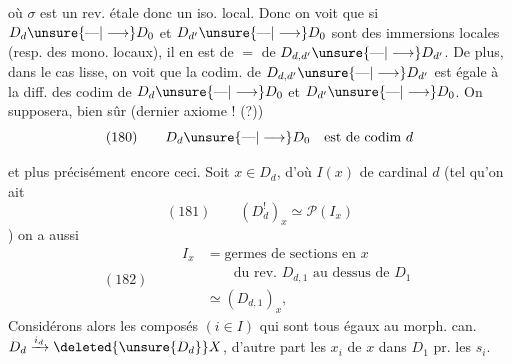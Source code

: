 où $\sigma$ est un rev. étale donc un iso. local. Donc on voit que si $D_d\unsure{\text{---}|\longrightarrow}D_0$ et $D_{d'}\unsure{\text{---}|\longrightarrow}D_0$ sont des immersions locales (resp. des mono. locaux), il en est de $=$ de $D_{d,d'}\unsure{\text{---}|\longrightarrow}D_{d'}$. De plus, dans le cas lisse, on voit que la codim. de $D_{d,d'}\unsure{\text{---}|\longrightarrow}D_{d'}$ est égale à la diff. des codim de $D_d\unsure{\text{---}|\longrightarrow}D_0$ et $D_{d'}\unsure{\text{---}|\longrightarrow}D_0$. On supposera, bien sûr (dernier axiome ! (?))
\[
(180)\qquad D_d\unsure{\text{---}|\longrightarrow}D_0\quad\text{est de codim }d
\]

 et plus précisément encore ceci. Soit  $x\in D_d$, d'où $I(x)$ de cardinal $d$ (tel qu'on ait
\[
(181)\qquad(D_d^!)_x\simeq\mathcal P(I_x)
\]
)
  on a aussi
\[
(182)\qquad\begin{aligned}
I_x&=\text{germes de sections en }x\\
&\qquad\text{du rev. }D_{d,1}\text{ au dessus de }D_1\\
&\simeq(D_{d,1})_x,
\end{aligned}
\]
Considérons alors les composés $(i\in I)$
qui sont tous égaux au morph. can. $D_d\xrightarrow{i_d}\deleted{\unsure{D_d}}X$, d'autre part les   $x_i$ de $x$ dans $D_1$ pr. les $s_i$.
